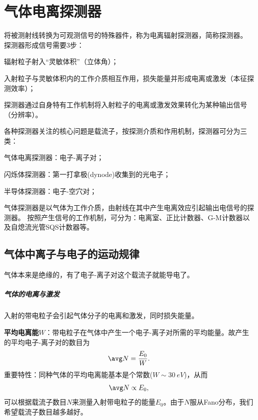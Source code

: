 \chapter{气体电离探测器}
将被测射线转换为可观测信号的特殊器件，称为电离辐射探测器，简称探测器。
探测器形成信号需要3步：
\begin{compactenum}
	\item 辐射粒子射入“灵敏体积”（立体角）；
	\item 入射粒子与灵敏体积内的工作介质相互作用，损失能量并形成电离或激发（本征探测效率）；
	\item 探测器通过自身特有工作机制将入射粒子的电离或激发效果转化为某种输出信号（分辨率）。
\end{compactenum}

各种探测器关注的核心问题是载流子，按探测介质和作用机制，探测器可分为三类：
\begin{compactitem}
	\item 气体电离探测器：电子-离子对；
	\item 闪烁体探测器：第一打拿极(dynode)收集到的光电子；
	\item 半导体探测器：电子-空穴对；
\end{compactitem}
气体探测器是以气体为工作介质，由射线在其中产生电离效应引起输出电信号的探测器。
按照产生信号的工作机制，可分为：电离室、正比计数器、G-M计数器以及自熄流光管SQS计数器等。

\section{气体中离子与电子的运动规律}

气体本来是绝缘的，有了电子-离子对这个载流子就能导电了。
\paragraph{气体的电离与激发}
入射的带电粒子会引起气体分子的电离和激发，同时损失能量。%

\textbf{平均电离能}$W$：带电粒子在气体中产生一个电子-离子对所需的平均能量。故产生的平均电子-离子对的数目为
\begin{align}
	\avg N=\frac{E_0}W.
\end{align}
重要特性：同种气体的平均电离能基本是个常数($W\sim\SI{30}{eV}$)，从而
\[
	\avg N\propto E_0,
\]
可以根据载流子数目$N$来测量入射带电粒子的能量$E_0$。由于$N$服从Fano分布，我们希望载流子数目越多越好。



